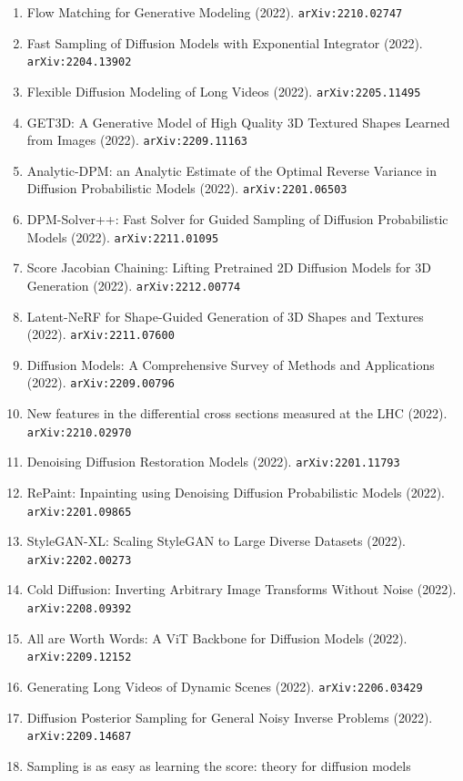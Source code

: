 \documentclass[11pt]{article}
\begin{document}
\begin{enumerate}
  \item Flow Matching for Generative Modeling (2022). \texttt{arXiv:2210.02747}
  \item Fast Sampling of Diffusion Models with Exponential Integrator (2022). \texttt{arXiv:2204.13902}
  \item Flexible Diffusion Modeling of Long Videos (2022). \texttt{arXiv:2205.11495}
  \item GET3D: A Generative Model of High Quality 3D Textured Shapes Learned
  from Images (2022). \texttt{arXiv:2209.11163}
  \item Analytic-DPM: an Analytic Estimate of the Optimal Reverse Variance in
  Diffusion Probabilistic Models (2022). \texttt{arXiv:2201.06503}
  \item DPM-Solver++: Fast Solver for Guided Sampling of Diffusion Probabilistic Models (2022). \texttt{arXiv:2211.01095}
  \item Score Jacobian Chaining: Lifting Pretrained 2D Diffusion Models for 3D
  Generation (2022). \texttt{arXiv:2212.00774}
  \item Latent-NeRF for Shape-Guided Generation of 3D Shapes and Textures (2022). \texttt{arXiv:2211.07600}
  \item Diffusion Models: A Comprehensive Survey of Methods and Applications (2022). \texttt{arXiv:2209.00796}
  \item New features in the differential cross sections measured at the LHC (2022). \texttt{arXiv:2210.02970}
  \item Denoising Diffusion Restoration Models (2022). \texttt{arXiv:2201.11793}
  \item RePaint: Inpainting using Denoising Diffusion Probabilistic Models (2022). \texttt{arXiv:2201.09865}
  \item StyleGAN-XL: Scaling StyleGAN to Large Diverse Datasets (2022). \texttt{arXiv:2202.00273}
  \item Cold Diffusion: Inverting Arbitrary Image Transforms Without Noise (2022). \texttt{arXiv:2208.09392}
  \item All are Worth Words: A ViT Backbone for Diffusion Models (2022). \texttt{arXiv:2209.12152}
  \item Generating Long Videos of Dynamic Scenes (2022). \texttt{arXiv:2206.03429}
  \item Diffusion Posterior Sampling for General Noisy Inverse Problems (2022). \texttt{arXiv:2209.14687}
  \item Sampling is as easy as learning the score: theory for diffusion models

\end{enumerate}
\end{document}
